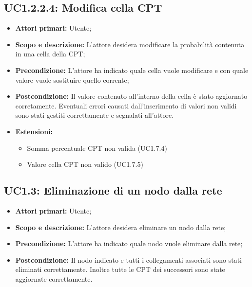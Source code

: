 \subsection{UC1.2.2.4: Modifica cella CPT} 
\begin{itemize} 
	\item{\textbf{Attori primari:} Utente;} 
	\item{\textbf{Scopo e descrizione:} L'attore desidera modificare la probabilità contenuta in una cella della CPT;} 
	\item{\textbf{Precondizione:} L'attore ha indicato quale cella vuole modificare e con quale valore vuole sostituire quello corrente;} 
	\item{\textbf{Postcondizione:} Il valore contenuto all'interno della cella è stato aggiornato corretamente. Eventuali errori causati dall'inserimento di valori non validi sono stati gestiti correttamente e segnalati all'attore.}
	\item{\textbf{Estensioni:}
		\begin{itemize}
			\item{Somma percentuale CPT non valida (UC1.7.4)}
			\item{Valore cella CPT non valido (UC1.7.5)}
		\end{itemize}
	}
\end{itemize} 
\subsection{UC1.3: Eliminazione di un nodo dalla rete} 
\begin{itemize} 
	\item{\textbf{Attori primari:} Utente;} 
	\item{\textbf{Scopo e descrizione:} L'attore desidera eliminare un nodo dalla rete;} 
	\item{\textbf{Precondizione:} L'attore ha indicato quale nodo vuole eliminare dalla rete;} 
	\item{\textbf{Postcondizione:} Il nodo indicato e tutti i collegamenti associati sono stati eliminati correttamente. Inoltre tutte le CPT dei successori sono state aggiornate correttamente.} 
\end{itemize} 
